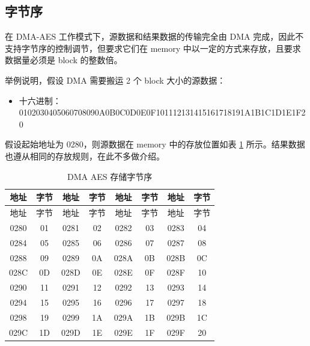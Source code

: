 \documentclass[main\_\_CN.tex]{subfiles}
\begin{document}
\subsection{字节序}

在 DMA-AES 工作模式下，源数据和结果数据的传输完全由 DMA 完成，因此不支持字节序的控制调节，但要求它们在 memory 中以一定的方式来存放，且要求数据量必须是 block 的整数倍。

举例说明，假设 DMA 需要搬运 2 个 block 大小的源数据：

\begin{itemize}
    \item 十六进制： 0102030405060708090A0B0C0D0E0F101112131415161718191A1B1C1D1E1F20
\end{itemize}

假设起始地址为 \hexprefix{}0280，则源数据在 memory 中的存放位置如表 \ref{table:DMAAESPlaintextCiphertextEndian} 所示。结果数据也遵从相同的存放规则，在此不多做介绍。

\begin{longtable}[c]
{ |c|c|c|c|c|c|c|c|}
\caption{DMA AES 存储字节序}
\label{table:DMAAESPlaintextCiphertextEndian}\\
\hline
\rowcolor{lightgray}
地址 &  字节  & 地址 &  字节  & 地址 &  字节  & 地址 &  字节 \\\hline
\endfirsthead
\hline
\rowcolor{lightgray}
地址 &  字节  & 地址 &  字节  & 地址 &  字节  & 地址 &  字节 \\\hline
\endhead
\endfoot
\hexprefix{}0280 & \hexprefix{}01 & \hexprefix{}0281 & \hexprefix{}02 & \hexprefix{}0282 & \hexprefix{}03 & \hexprefix{}0283 & \hexprefix{}04 \\\hline
\hexprefix{}0284 & \hexprefix{}05 & \hexprefix{}0285 & \hexprefix{}06 & \hexprefix{}0286 & \hexprefix{}07 & \hexprefix{}0287 & \hexprefix{}08 \\\hline
\hexprefix{}0288 & \hexprefix{}09 & \hexprefix{}0289 & \hexprefix{}0A & \hexprefix{}028A & \hexprefix{}0B & \hexprefix{}028B & \hexprefix{}0C \\\hline
\hexprefix{}028C & \hexprefix{}0D & \hexprefix{}028D & \hexprefix{}0E & \hexprefix{}028E & \hexprefix{}0F & \hexprefix{}028F & \hexprefix{}10 \\\hline
\hexprefix{}0290 & \hexprefix{}11 & \hexprefix{}0291 & \hexprefix{}12 & \hexprefix{}0292 & \hexprefix{}13 & \hexprefix{}0293 & \hexprefix{}14 \\\hline
\hexprefix{}0294 & \hexprefix{}15 & \hexprefix{}0295 & \hexprefix{}16 & \hexprefix{}0296 & \hexprefix{}17 & \hexprefix{}0297 & \hexprefix{}18 \\\hline
\hexprefix{}0298 & \hexprefix{}19 & \hexprefix{}0299 & \hexprefix{}1A & \hexprefix{}029A & \hexprefix{}1B & \hexprefix{}029B & \hexprefix{}1C \\\hline
\hexprefix{}029C & \hexprefix{}1D & \hexprefix{}029D & \hexprefix{}1E & \hexprefix{}029E & \hexprefix{}1F & \hexprefix{}029F & \hexprefix{}20 \\\hline
\end{longtable}
\end{document}
